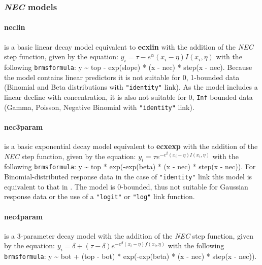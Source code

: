 \documentclass[
  shortnames]{jss}
\begin{document}
\newpage

\subsubsection[NEC models]{\textit{NEC} models}\label{nec-models}

\hypertarget{neclin}{%
\paragraph{neclin}\label{neclin}}

is a basic linear decay model equivalent to \textbf{ecxlin} with the addition of the \emph{NEC} step function, given by the equation:
\(y_i = \tau - e^{\alpha} \left(x_i - \eta \right) I(x_i, \eta)\)
with the following \texttt{brmsformula}: y \textasciitilde{} top - exp(slope) * (x - nec) * step(x - nec). Because the model contains linear predictors it is not suitable for 0, 1-bounded data (Binomial and Beta distributions with \texttt{"identity"} link). As the model includes a linear decline with concentration, it is also not suitable for 0, \texttt{Inf} bounded data (Gamma, Poisson, Negative Binomial with \texttt{"identity"} link).

\hypertarget{nec3param}{%
\paragraph{nec3param}\label{nec3param}}

is a basic exponential decay model equivalent to \textbf{ecxexp} with the addition of the \emph{NEC} step function, given by the equation:
\(y_i = \tau e^{-e^{\beta} \left(x_i - \eta \right) I(x_i, \eta)}\)
with the following \texttt{brmsformula}: y \textasciitilde{} top * exp(-exp(beta) * (x - nec) * step(x - nec)). For Binomial-distributed response data in the case of \texttt{"identity"} link this model is equivalent to that in \citet{Fox2010}. The model is 0-bounded, thus not suitable for Gaussian response data or the use of a \texttt{"logit"} or \texttt{"log"} link function.

\hypertarget{nec4param}{%
\paragraph{nec4param}\label{nec4param}}

is a 3-parameter decay model with the addition of the \emph{NEC} step function, given by the equation:
\(y_i = \delta + (\tau - \delta) e^{-e^{\beta} \left(x_i - \eta \right) f(x_i, \eta)}\)
with the following \texttt{brmsformula}: y \textasciitilde{} bot + (top - bot) * exp(-exp(beta) * (x - nec) * step(x - nec)).
\end{document}

